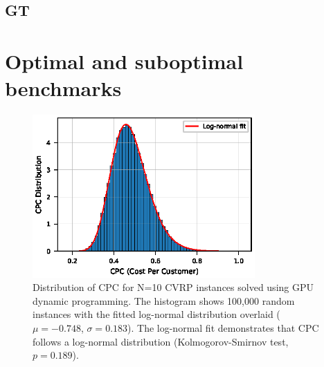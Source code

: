 \documentclass[a4paper,twoside]{article}
\begin{document}
\subsection{GT}


\section{Optimal and suboptimal benchmarks}


\begin{figure}[t!]
\centering
   \includegraphics[width=85mm]{figures/cpc_histogram_paper_100k.eps}
   \caption{Distribution of CPC for N=10 CVRP instances solved using GPU dynamic programming. The histogram shows 100,000 random instances with the fitted log-normal distribution overlaid ($\mu=-0.748$, $\sigma=0.183$). The log-normal fit demonstrates that CPC follows a log-normal distribution (Kolmogorov-Smirnov test, $p=0.189$).}
\label{fig:benchmark}
\end{figure}
\end{document}
